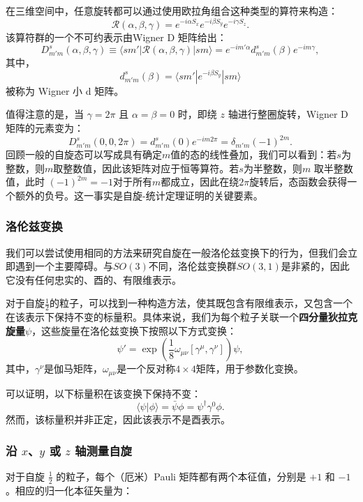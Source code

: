 在三维空间中，任意旋转都可以通过使用欧拉角组合这种类型的算符来构造：  
\[
\mathcal{R}(\alpha ,\beta ,\gamma )=e^{-i\alpha S_{x}}e^{-i\beta S_{y}}e^{-i\gamma S_{z}}.~
\]
该算符群的一个不可约表示由Wigner D 矩阵给出：
\[
D_{m'm}^{s}(\alpha ,\beta ,\gamma )\equiv \langle sm'|\mathcal{R}(\alpha ,\beta ,\gamma )|sm\rangle =e^{-im'\alpha } d_{m'm}^{s}(\beta ) e^{-im\gamma },~
\]
其中，  
\[
d_{m'm}^{s}(\beta )=\langle sm'|e^{-i\beta S_{y}}|sm\rangle~
\]
被称为 Wigner 小 d 矩阵。  

值得注意的是，当 \( \gamma = 2\pi \) 且 \( \alpha = \beta = 0 \) 时，即绕 \( z \) 轴进行整圈旋转，Wigner D 矩阵的元素变为：  
\[
D_{m'm}^{s}(0,0,2\pi )=d_{m'm}^{s}(0)e^{-im2\pi }=\delta _{m'm}(-1)^{2m}.~
\]
回顾一般的自旋态可以写成具有确定\(m\)值的态的线性叠加，我们可以看到：若\(s\)为整数，则\(m\)取整数值，因此该矩阵对应于恒等算符。若\(s\)为半整数，则\( m \) 取半整数值，此时 \( (-1)^{2m} = -1 \)对于所有\(m \)都成立，因此在绕\(2\pi\)旋转后，态函数会获得一个额外的负号。这一事实是自旋-统计定理证明的关键要素。
\subsubsection{洛伦兹变换}
我们可以尝试使用相同的方法来研究自旋在一般洛伦兹变换下的行为，但我们会立即遇到一个主要障碍。与\(SO(3)\)不同，洛伦兹变换群\(SO(3,1)\)是非紧的，因此它没有任何忠实的、酉的、有限维表示。  

对于自旋\(\frac{1}{2}\)的粒子，可以找到一种构造方法，使其既包含有限维表示，又包含一个在该表示下保持不变的标量积。具体来说，我们为每个粒子关联一个\textbf{四分量狄拉克旋量}\( \psi \)，这些旋量在洛伦兹变换下按照以下方式变换：  
\[
\psi' = \exp \left(\frac{1}{8} \omega_{\mu \nu} [\gamma^\mu, \gamma^\nu] \right) \psi,~
\]
其中，\(\gamma^\nu\)是伽马矩阵，\(\omega_{\mu \nu}\)是一个反对称\(4 \times 4\)矩阵，用于参数化变换。  

可以证明，以下标量积在该变换下保持不变：  
\[
\langle \psi | \phi \rangle = \bar{\psi} \phi = \psi^\dagger \gamma^0 \phi.~
\]
然而，该标量积并非正定，因此该表示不是酉表示。
\subsubsection{沿 \( x \)、\( y \) 或 \( z \) 轴测量自旋} 
对于自旋 \( \frac{1}{2} \) 的粒子，每个（厄米）Pauli 矩阵都有两个本征值，分别是 \( +1 \) 和 \( -1 \)。相应的归一化本征矢量为：  

